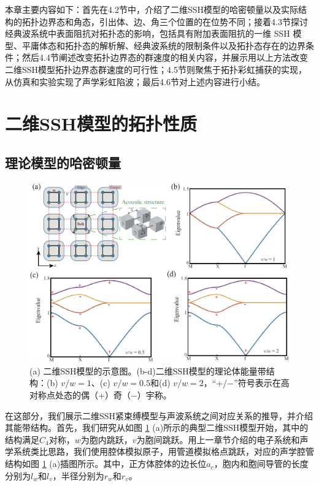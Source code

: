本章主要内容如下：首先在4.2节中，介绍了二维SSH模型的哈密顿量以及实际结构的拓扑边界态和角态，引出体、边、角三个位置的在位势不同；接着4.3节探讨经典波系统中表面阻抗对拓扑态的影响，包括具有附加表面阻抗的一维 SSH 模型、平庸体态和拓扑态的解析解、经典波系统的限制条件以及拓扑态存在的边界条件；然后4.4节阐述改变拓扑边界态的群速度的相关内容，并展示用以上方法改变二维SSH模型拓扑边界态群速度的可行性；4.5节则聚焦于拓扑彩虹捕获的实现，从仿真和实验实现了声学彩虹陷波；最后4.6节对上述内容进行小结。

\section{二维SSH模型的拓扑性质}

\subsection{理论模型的哈密顿量}
\begin{figure}[h!]
    \centering
    \includegraphics[width=1\textwidth]{images/fig4-1.eps} 
    \caption{(a) 二维SSH模型的示意图。(b-d)二维SSH模型的理论体能量带结构：(b) $v/w = 1$、(c) $v/w = 0.5$和(d) $v/w = 2$，“+/−”符号表示在高对称点处态的偶（+）奇（−）宇称。}
    \label{fig_4_1}
  \end{figure}  

在这部分，我们展示二维SSH紧束缚模型与声波系统之间对应关系的推导，并介绍其能带结构。首先，我们研究从如图 \ref{fig_4_1} (a)所示的典型二维SSH模型开始，其中的结构满足$C_4$对称，$w$为胞内跳跃，$v$为胞间跳跃。用上一章节介绍的电子系统和声学系统类比思路，我们使用腔体模拟原子，用管道模拟格点跳跃，对应的声学腔管结构如图 \ref{fig_4_1} (a)插图所示。其中，正方体腔体的边长位$a_c$，胞内和胞间导管的长度分别为$l_w$和$l_v$，半径分别为$r_w$和$r_v$。

